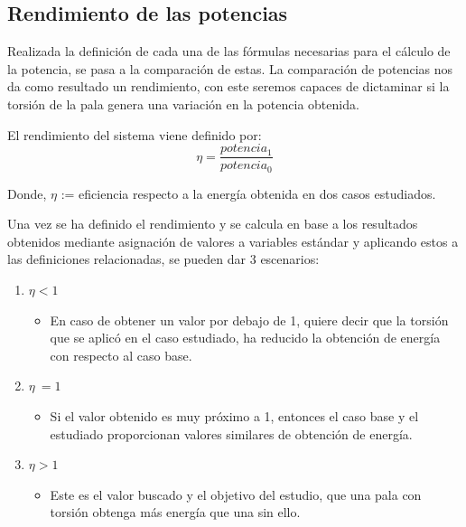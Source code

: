  
 \subsection{Rendimiento de las potencias}
 \label{section:rendimiento}
 
Realizada la definición de cada una de las fórmulas necesarias para el cálculo de la potencia, se pasa a la comparación de estas. La comparación de potencias nos da como resultado un rendimiento, con este seremos capaces de dictaminar si la torsión de la pala genera una variación en la potencia obtenida.
 
   \begin{definicion}
El rendimiento del sistema viene definido por:
 $$ \eta = \dfrac{potencia_1}{potencia_0} $$ 
 
 Donde,
  \centering $\eta$ := eficiencia respecto a la energía obtenida en dos casos estudiados.
 \label{def:rendimiento_potencias}
 \end{definicion}
 
 Una vez se ha definido el rendimiento y se calcula en base a los resultados obtenidos mediante asignación de valores a variables estándar y aplicando estos a las definiciones relacionadas, se pueden dar 3 escenarios:
 

\begin{enumerate}
    \item $\eta < 1$
        \begin{itemize}
            \item En caso de obtener un valor por debajo de 1, quiere decir que la torsión que se aplicó en el caso estudiado, ha reducido la obtención de energía con respecto al caso base. 
        \end{itemize}
    \item $\eta ~= 1$
        \begin{itemize}
            \item Si el valor obtenido es muy próximo a 1, entonces el caso base y el estudiado proporcionan valores similares de obtención de energía.
        \end{itemize}
    \item $\eta > 1$
        \begin{itemize}
            \item Este es el valor buscado y el objetivo del estudio, que una pala con torsión obtenga más energía que una sin ello.
        \end{itemize}
\end{enumerate}

